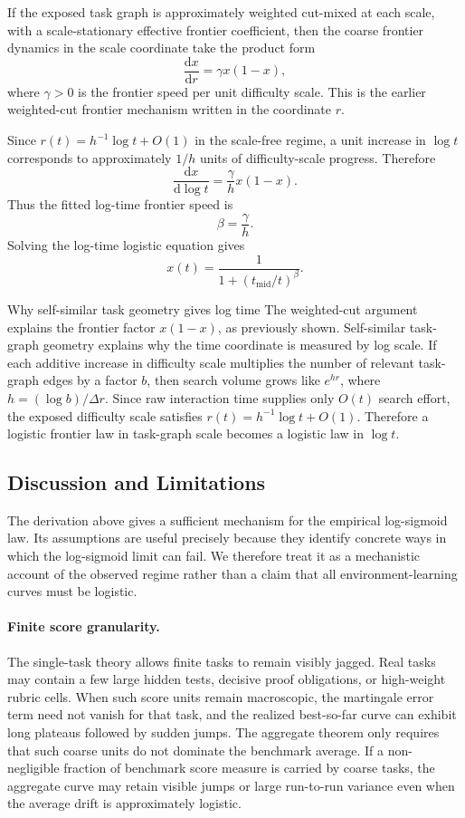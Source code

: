 If the exposed task graph is approximately weighted cut-mixed at each scale, with a scale-stationary effective frontier coefficient, then the coarse frontier dynamics in the scale coordinate take the product form
\[
    \frac{\mathrm dx}{\mathrm dr}
    =
    \gamma x(1-x),
\]
where \(\gamma>0\) is the frontier speed per unit difficulty scale. This is the earlier weighted-cut frontier mechanism written in the coordinate \(r\).

Since \(r(t)=h^{-1}\log t+O(1)\) in the scale-free regime, a unit increase in \(\log t\) corresponds to approximately \(1/h\) units of difficulty-scale progress. Therefore
\[
    \frac{\mathrm dx}{\mathrm d\log t}
    =
    \frac{\gamma}{h}x(1-x).
\]
Thus the fitted log-time frontier speed is
\[
    \beta=\frac{\gamma}{h}.
\]
Solving the log-time logistic equation gives
\[
    x(t)
    =
    \frac{1}{1+(t_{\mathrm{mid}}/t)^\beta}.
\]

\begin{readingbox}{Why self-similar task geometry gives log time}
The weighted-cut argument explains the frontier factor \(x(1-x)\), as previously shown. Self-similar task-graph geometry explains why the time coordinate is measured by log scale. If each additive increase in difficulty scale multiplies the number of relevant task-graph edges by a factor \(b\), then search volume grows like \(e^{hr}\), where \(h=(\log b)/\Delta r\). Since raw interaction time supplies only \(O(t)\) search effort, the exposed difficulty scale satisfies \(r(t)=h^{-1}\log t+O(1)\). Therefore a logistic frontier law in task-graph scale becomes a logistic law in \(\log t\).
\end{readingbox}

\subsection{Discussion and Limitations}
\label{subsec:theory-discussion-limitations}

The derivation above gives a sufficient mechanism for the empirical log-sigmoid law. Its assumptions are useful precisely because they identify concrete ways in which the log-sigmoid limit can fail. We therefore treat it as a mechanistic account of the observed regime rather than a claim that all environment-learning curves must be logistic.

\paragraph{Finite score granularity.}
The single-task theory allows finite tasks to remain visibly jagged. Real tasks may contain a few large hidden tests, decisive proof obligations, or high-weight rubric cells. When such score units remain macroscopic, the martingale error term need not vanish for that task, and the realized best-so-far curve can exhibit long plateaus followed by sudden jumps. The aggregate theorem only requires that such coarse units do not dominate the benchmark average. If a non-negligible fraction of benchmark score measure is carried by coarse tasks, the aggregate curve may retain visible jumps or large run-to-run variance even when the average drift is approximately logistic.

